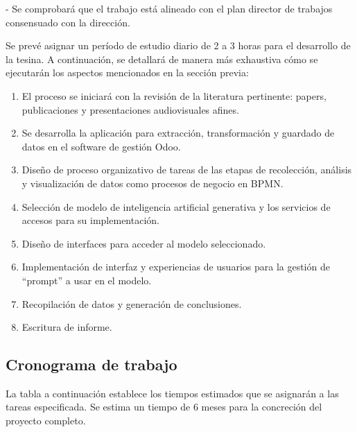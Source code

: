 \documentclass[12pt]{article}
\begin{document}
- Se comprobará que el trabajo está alineado con el plan director de trabajos consensuado con la dirección.


\vspace{1cm}

Se prevé asignar un período de estudio diario de 2 a 3 horas para el desarrollo de la tesina. A continuación, se detallará de manera más exhaustiva cómo se ejecutarán los aspectos mencionados en la sección previa:

\begin{enumerate}
    \item El proceso se iniciará con la revisión de la literatura pertinente: papers, publicaciones y presentaciones audiovisuales afines.
    \item Se desarrolla la aplicación para extracción, transformación y guardado de datos en el software de gestión Odoo.
    \item Diseño de proceso organizativo de tareas de las etapas de recolección, análisis y visualización de datos como procesos de negocio en BPMN.
    \item Selección de modelo de inteligencia artificial generativa y los servicios de accesos para su implementación.
    \item Diseño de interfaces para acceder al modelo seleccionado.
    \item Implementación de interfaz y experiencias de usuarios para la gestión de ``prompt'' a usar en el modelo.
    \item Recopilación de datos y generación de conclusiones.
    \item Escritura de informe.
\end{enumerate}


\subsection{Cronograma de trabajo}

La tabla a continuación establece los tiempos estimados que se asignarán a las tareas especificada.
Se estima un tiempo de 6 meses para la concreción del proyecto completo.
\end{document}

